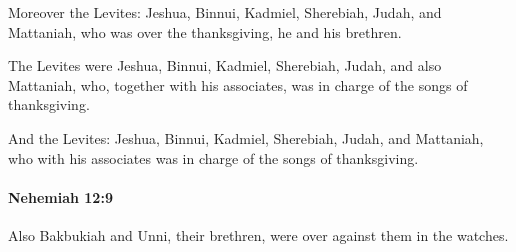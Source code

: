 			\begin{versebox}
					\item[BHS] 
					\item[LXX] 
					\item[ASV] Moreover the Levites: Jeshua, Binnui, Kadmiel, Sherebiah, Judah, and Mattaniah, who was over the thanksgiving, he and his brethren.
					\item[NIV] The Levites were Jeshua, Binnui, Kadmiel, Sherebiah, Judah, and also Mattaniah, who, together with his associates, was in charge of the songs of thanksgiving.
					\item[NRSV] And the Levites: Jeshua, Binnui, Kadmiel, Sherebiah, Judah, and Mattaniah, who with his associates was in charge of the songs of thanksgiving.
			\end{versebox}

		\paragraph{Nehemiah 12:9} %
			\label{NEHEMIAH-12-9}

			Also Bakbukiah and Unni, their brethren, were over against them in the watches.

